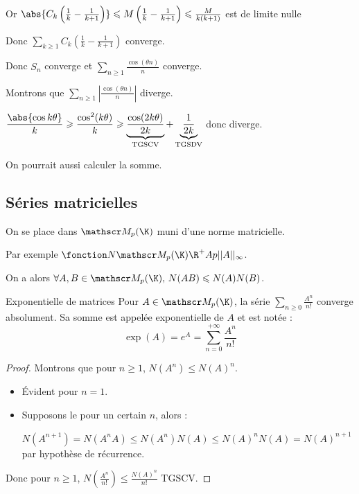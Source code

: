 Or $\abs{C_k \left( \frac 1 k - \frac 1 {k + 1} \right)} \leqslant M \left( \frac 1 k - \frac 1 {k + 1} \right) \leqslant \frac M {k(k+1)}$
est de limite nulle 

Donc $\sum_{k \geqslant 1} C_k \left( \frac 1 k - \frac 1 {k + 1} \right)$ converge. 

Donc $S_n$ converge et $\sum_{n \geqslant 1 } \frac{\cos(\theta n)}{n}$ converge.

\lvspace Montrons que $\sum_{n \geqslant 1} \left| \frac{\cos(\theta n)}{n} \right|$ diverge. 

$\displaystyle \frac{\abs{\cos{k \theta }}}{ k } \geqslant  \frac{\cos^2(k \theta )}{k } \geqslant \underbrace{\frac{\cos(2k \theta)}{2k}}_{\text{TGSCV}} + \underbrace{\frac{ 1 }{ 2 k }}_{\text{TGSDV}}$ 
donc diverge. 

\begin{remarque}
    On pourrait aussi calculer la somme.
\end{remarque}

\subsection{Séries matricielles}

On se place dans $\mathscr M_p(\K)$ muni d'une norme matricielle. 

Par exemple $\fonction N {\mathscr M_p(\K)} {\R^+} A {p ||A||_\infty}$. 

On a alors $\forall A, B \in \mathscr M_p(\K), \, N(AB) \leqslant N(A) N(B)$.

\begin{theoreme}{Exponentielle de matrices}{}
    Pour $A \in \mathscr M_p(\K)$, la série $\sum_{n \geqslant 0} \frac{A^n}{n!}$ converge absolument. 
    Sa somme est appelée exponentielle de $A$ et est notée :
    \[\displaystyle \exp(A) = e^A = \sum_{n = 0}^{+\infty} \frac{A^n}{n!}\]
\end{theoreme}


\begin{proof}
    Montrons que pour $n \geqslant 1$, $N(A^n) \leqslant N(A)^n$.

    \begin{itemize}
        \item Évident pour $n = 1$. 

        \item Supposons le pour un certain $n$, alors :

        $N(A^{n + 1}) = N(A^n A) \leqslant N(A^n) N(A) \leqslant N(A)^n N(A) = N(A)^{n + 1}$
        par hypothèse de récurrence.
    \end{itemize}

    Donc pour $n \geqslant 1$, $N\left( \frac{A^n}{n!} \right) \leqslant \frac{N(A)^n}{n!}$ TGSCV. 
\end{proof}

